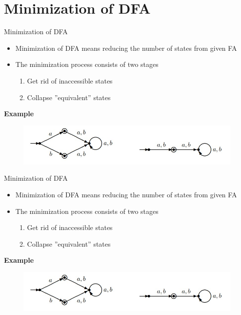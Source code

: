 \documentclass{beamer}
\begin{document}
\section{Minimization of DFA}
\begin{frame}{Minimization of DFA}
		\begin{itemize}
			\item Minimization of DFA means reducing the number of states from given FA
			\item The minimization process consists of two stages
			\begin{enumerate}
				\item Get rid of inaccessible states
				\item Collapse ”equivalent” states
			\end{enumerate}
		\end{itemize}
	\textbf{Example}
		\begin{figure}
		\includegraphics[scale=.5]{img2/m12}
	\end{figure}
\end{frame}
\begin{frame}{Minimization of DFA}
	\begin{itemize}
		\item Minimization of DFA means reducing the number of states from given FA
		\item The minimization process consists of two stages
		\begin{enumerate}
			\item Get rid of inaccessible states
			\item Collapse ”equivalent” states
		\end{enumerate}
	\end{itemize}
	\textbf{Example}
	\begin{figure}
		\includegraphics[scale=.5]{img2/m12}
	\end{figure}
\end{frame}
\end{document}
